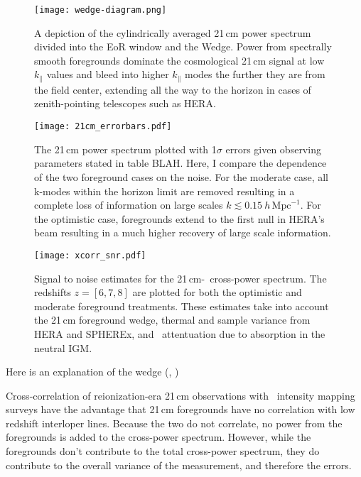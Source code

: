 \begin{figure}[ht]
	\centering
	\texttt{[image: wedge-diagram.png]}
	\caption[Foreground Wedge]{A depiction of the cylindrically averaged 21\,cm power spectrum divided into
					the EoR window and the Wedge. Power from spectrally smooth foregrounds dominate the cosmological
					21\,cm signal at low $k_{\parallel}$ values and bleed into higher $k_{\parallel}$ modes the further
					they are from the field center, extending all the way to the horizon in cases of zenith-pointing
					telescopes such as HERA.}
	\label{fig:wedge}
\end{figure}

\begin{figure}[th]
	\centering
	\texttt{[image: 21cm\_errorbars.pdf]}
	\caption[Optimistic vs. Moderate Foreground Treatment]{The 21\,cm power spectrum plotted with 1$\sigma$ errors given
																												 observing parameters stated in table BLAH. Here, I compare the
																												 dependence of the two foreground cases on the noise. For the moderate case,
																												 all k-modes within the horizon limit are removed resulting in a complete loss of information on large scales $k \lesssim 0.15 \ h\,\textrm{Mpc}^{-1}$. For the optimistic case, foregrounds extend to the first null in HERA's beam resulting in
																												 a much higher recovery of large scale information.}
	\label{fig:21cm_errors}
\end{figure}

\begin{figure}[th]
	\centering
	\texttt{[image: xcorr\_snr.pdf]}
	\caption[Cross-Power Spectrum Signal-to-Noise]{Signal to noise estimates for the 21\,cm-\lya\ cross-power spectrum.
	The redshifts $z = [6, 7, 8]$ are plotted for both the optimistic and moderate foreground treatments. These estimates take
	into account the 21\,cm foreground wedge, thermal and sample variance from HERA and SPHEREx, and \lya\ attentuation due to
	absorption in the neutral IGM.}
	\label{fig:snr}
\end{figure}



Here is an explanation of the wedge (\cite{2010ApJ...724..526D}, \cite{2012ApJ...752..137M})

Cross-correlation of reionization-era 21\,cm observations with \lya\ intensity
mapping surveys have the advantage that 21\,cm foregrounds have no correlation with
low redshift interloper lines. Because the two do not correlate, no power from the foregrounds
is added to the cross-power spectrum. However, while the foregrounds don't contribute
to the total cross-power spectrum, they do contribute to the overall variance
of the measurement, and therefore the errors.

